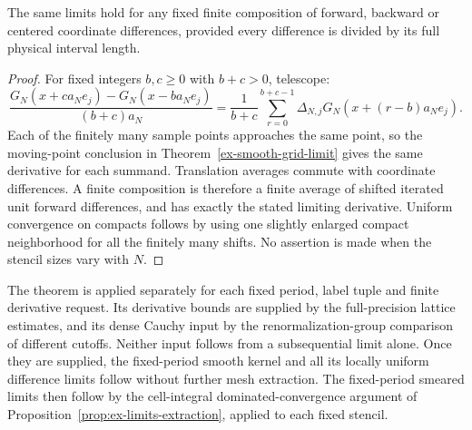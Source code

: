 \begin{corollary}\label{ex-other-stencils}
The same limits hold for any fixed finite composition of forward,
backward or centered coordinate differences, provided every difference
is divided by its full physical interval length.
\end{corollary}
\begin{proof}
For fixed integers \(b,c\ge0\) with \(b+c>0\), telescope:
\[
 \frac{G_N(x+ca_Ne_j)-G_N(x-ba_Ne_j)}{(b+c)a_N}
 =\frac1{b+c}\sum_{r=0}^{b+c-1}
       \Delta_{N,j}G_N(x+(r-b)a_Ne_j).
\]
Each of the finitely many sample points approaches the same point, so
the moving-point conclusion in Theorem~\ref{ex-smooth-grid-limit} gives
the same derivative for each summand. Translation averages commute with
coordinate differences. A finite composition is therefore a finite
average of shifted iterated unit forward differences, and has exactly
the stated limiting derivative. Uniform convergence on compacts follows
by using one slightly enlarged compact neighborhood for all the finitely
many shifts. No assertion is made when the stencil sizes vary with \(N\).
\end{proof}

The theorem is applied separately for each fixed period, label tuple and
finite derivative request. Its derivative bounds are supplied by the
full-precision lattice estimates, and its dense Cauchy input by the
renormalization-group comparison of different cutoffs. Neither input
follows from a subsequential limit alone. Once they are supplied, the
fixed-period smooth kernel and all its locally uniform difference limits
follow without further mesh extraction. The fixed-period smeared limits
then follow by the cell-integral dominated-convergence argument of
Proposition~\ref{prop:ex-limits-extraction}, applied to each fixed stencil.
